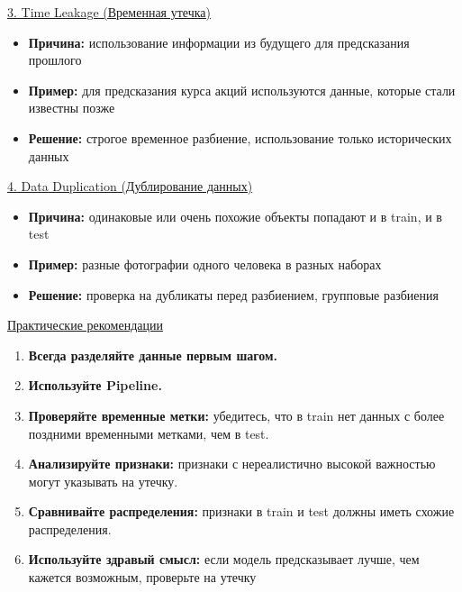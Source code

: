 \underline{3. Time Leakage (Временная утечка)}

\begin{itemize}
    \item \textbf{Причина:} использование информации из будущего для предсказания прошлого
    \item \textbf{Пример:} для предсказания курса акций используются данные, которые стали известны позже
    \item \textbf{Решение:} строгое временное разбиение, использование только исторических данных
\end{itemize}

\underline{4. Data Duplication (Дублирование данных)}

\begin{itemize}
    \item \textbf{Причина:} одинаковые или очень похожие объекты попадают и в train, и в test
    \item \textbf{Пример:} разные фотографии одного человека в разных наборах
    \item \textbf{Решение:} проверка на дубликаты перед разбиением, групповые разбиения
\end{itemize}



\underline{Практические рекомендации}

\begin{enumerate}
    \item \textbf{Всегда разделяйте данные первым шагом.}
    \item \textbf{Используйте Pipeline.}
    \item \textbf{Проверяйте временные метки:} убедитесь, что в train нет данных с более поздними временными
    метками, чем в test.
    \item \textbf{Анализируйте признаки:} признаки с нереалистично высокой важностью могут указывать
    на утечку.
    \item \textbf{Сравнивайте распределения:} признаки в train и test должны иметь схожие распределения.
    \item \textbf{Используйте здравый смысл:} если модель предсказывает лучше, чем кажется возможным, проверьте на
    утечку
\end{enumerate}

